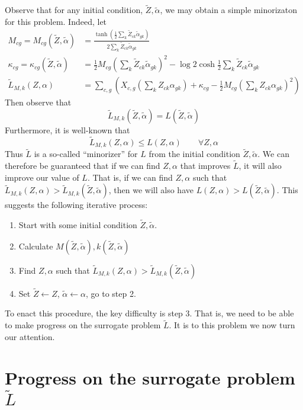 \documentclass{article}
\begin{document}
Observe that for any initial condition, $\tilde Z,\tilde \alpha$, we may obtain a simple minorizaton for this problem.  Indeed, let
\begin{align*}
M_{cg}=M_{cg}(\tilde Z,\tilde \alpha) &=\frac{\tanh \left(\frac{1}{2}\sum_k \tilde Z_{ck} \tilde \alpha_{gk}\right)}{2\sum_k \tilde Z_{ck} \tilde \alpha_{gk}}\\
\kappa_{cg} = \kappa_{cg}(\tilde Z,\tilde \alpha) &=  \frac{1}{2}M_{cg}\left(\sum_k \tilde Z_{ck} \tilde \alpha_{gk}\right)^2 - \log 2 \cosh \frac{1}{2}\sum_k \tilde Z_{ck} \tilde \alpha_{gk}\\
\tilde L_{M,k}(Z,\alpha) &= \sum_{c,g} \left(X_{c,g}\left(\sum_k Z_{ck} \alpha_{gk}\right) + \kappa_{cg} - \frac{1}{2}M_{cg}\left(\sum_k Z_{ck} \alpha_{gk}\right)^2 \right)
\end{align*}
Then observe that
\[
\tilde L_{M,k}(\tilde Z,\tilde \alpha) = L(\tilde Z,\tilde \alpha)
\]
Furthermore, it is well-known that
\[
\tilde L_{M,k}(Z,\alpha) \leq L(Z,\alpha) \qquad \forall Z,\alpha
\]
Thus $\tilde L$ is a so-called ``minorizer'' for $L$ from the initial condition $\tilde Z,\tilde \alpha$.  We can therefore be guaranteed that if we can find $Z,\alpha$ that improves $\tilde L$, it will also improve our value of $L$.  That is, if we can find $Z,\alpha$ such that $\tilde L_{M,k}(Z,\alpha)>\tilde L_{M,k}(\tilde Z,\tilde \alpha)$, then we will also have $L(Z,\alpha)>L(\tilde Z,\tilde \alpha)$.  This suggests the following iterative process:

\begin{enumerate}
    \item Start with some initial condition $\tilde Z,\tilde \alpha$.
    \item Calculate $M(\tilde Z,\tilde \alpha),k(\tilde Z,\tilde \alpha)$
    \item Find $Z,\alpha$ such that $\tilde L_{M,k}(Z,\alpha)>\tilde L_{M,k}(\tilde Z,\tilde \alpha)$
    \item Set $\tilde Z \gets Z$, $\tilde \alpha \gets \alpha$, go to step 2.
\end{enumerate}

To enact this procedure, the key difficulty is step 3.  That is, we need to be able to make progress on the surrogate problem $\tilde L$.  It is to this problem we now turn our attention.

\section{Progress on the surrogate problem $\tilde L$}
\end{document}

